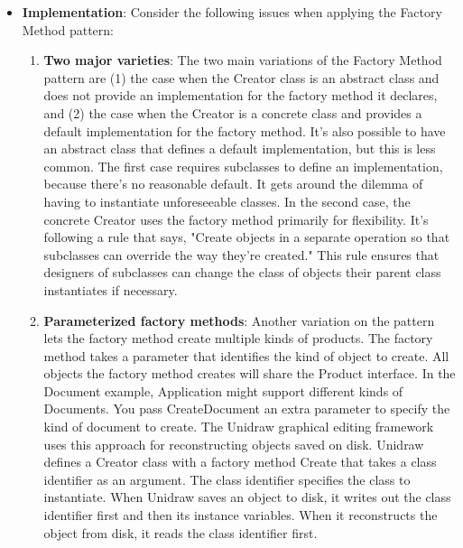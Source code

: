 \documentclass{report}
\begin{document}
\begin{itemize}
\begin{enumerate}
                    \bigbreak \noindent 
                    Notice how the factory method defines the connection between the two class hierarchies. It localizes knowledge of which classes belong together.
            \end{enumerate}
        \item \textbf{Implementation}: Consider the following issues when applying the Factory Method pattern:
            \begin{enumerate}
                \item \textbf{Two major varieties}: The two main variations of the Factory Method pattern are (1) the case when the Creator class is an abstract class and does not provide an implementation for the factory method it declares, and (2) the case when the Creator is a concrete class and provides a default implementation for the factory method. It's also possible to have an abstract class that defines a default implementation, but this is less common.
                    \bigbreak \noindent 
                    The first case requires subclasses to define an implementation, because there's no reasonable default. It gets around the dilemma of having to instantiate unforeseeable classes. In the second case, the concrete Creator uses the factory method primarily for flexibility. It's following a rule that says, "Create objects in a separate operation so that subclasses can override the way they're created." This rule ensures that designers of subclasses can change the class of objects their parent class instantiates if necessary.
                \item \textbf{Parameterized factory methods}: Another variation on the pattern lets the factory method create multiple kinds of products. The factory method takes a parameter that identifies the kind of object to create. All objects the factory method creates will share the Product interface. In the Document example, Application might support different kinds of Documents. You pass CreateDocument an extra parameter to specify the kind of document to create.
                    \bigbreak \noindent 
                    The Unidraw graphical editing framework uses this approach for reconstructing objects saved on disk. Unidraw defines a Creator class with a factory method Create that takes a class identifier as an argument. The class identifier specifies the class to instantiate. When Unidraw saves an object to disk, it writes out the class identifier first and then its instance variables. When it reconstructs the object from disk, it reads the class identifier first.

\end{enumerate}
\end{itemize}
\end{document}
